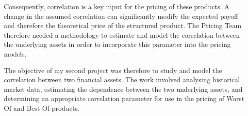 \documentclass{article}
\begin{document}
Consequently, correlation is a key input for the pricing of these products. A change in the assumed correlation can significantly modify the expected payoff and therefore the theoretical price of the structured product. The Pricing Team therefore needed a methodology to estimate and model the correlation between the underlying assets in order to incorporate this parameter into the pricing models.

The objective of my second project was therefore to study and model the correlation between two financial assets. The work involved analysing historical market data, estimating the dependence between the two underlying assets, and determining an appropriate correlation parameter for use in the pricing of Worst Of and Best Of products.



\end{document}
